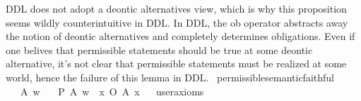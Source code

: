 \begin{isabellebody}
{DDL does not adopt a deontic alternatives view, which is why this proposition seems wildly counterintuitive
in DDL. In DDL, the ob operator abstracts away the notion of deontic alternatives and completely determines
obligations. Even if one belives that permissible statements should be true at some deontic alternative, 
it's not clear that permissible statements must be realized at some world, hence the failure of this 
lemma in DDL.%
}\isanewline
%
%
\endisatagproof
{\isafoldproof}%
%
\isadelimproof
%
\endisadelimproof
\isanewline
\isanewline
{}\isamarkupfalse%
\ permissible{\isacharunderscore}semantic{\isacharunderscore}faithful{\isacharunderscore}{}{\isacharcolon}\isanewline
\ \ \ A\ w\isanewline
\ \ \ {\isachardoublequoteopen}P\ {\isacharbraceleft}A{\isacharbraceright}\ w\ {\isasymlongrightarrow}\ {\isacharparenleft}{\isasymexists}x{\isachardot}\ O\ {\isacharbraceleft}A{\isacharbraceright}\ x{\isacharparenright}{\isachardoublequoteclose}\isanewline
\ \ \isamarkupfalse%
{\isacharbrackleft}user{\isacharunderscore}axioms{\isacharbrackright}%
\isadelimproof
\ %
\endisadelimproof
%
\isatagproof
{}\isamarkupfalse%
\isanewline
%
\end{isabellebody}
